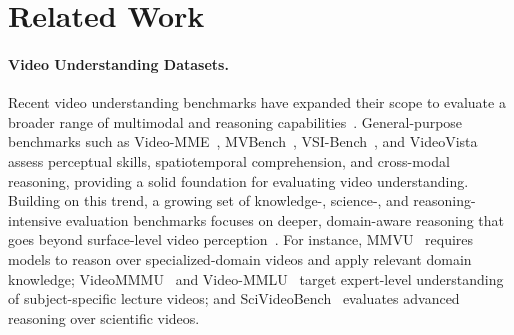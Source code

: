 \documentclass{llmxive}
\begin{document}
\section{Related Work}

\paragraph{Video Understanding Datasets.}
Recent video understanding benchmarks have expanded their scope to evaluate a broader range of multimodal and reasoning capabilities~\cite{Wu2024STARAB, Zhou2024MLVUBM, videmme, mmvu, scivideobench, li2024videovistaversatilebenchmarkvideo, liu2026videoreasonbenchmllmsperformvisioncentric, xu2025expvidbenchmarkexperimentvideo}.
General-purpose benchmarks such as Video-MME~\cite{videmme}, MVBench~\cite{mvbench}, VSI-Bench~\cite{vsibench}, and VideoVista~\cite{li2024videovistaversatilebenchmarkvideo} assess perceptual skills, spatiotemporal comprehension, and cross-modal reasoning, providing a solid foundation for evaluating video understanding.
Building on this trend, a growing set of knowledge-, science-, and reasoning-intensive evaluation benchmarks focuses on deeper, domain-aware reasoning that goes beyond surface-level video perception~\cite{xu2025expvidbenchmarkexperimentvideo, liu2026videoreasonbenchmllmsperformvisioncentric}.
For instance, MMVU~\cite{mmvu} requires models to reason over specialized-domain videos and apply relevant domain knowledge; VideoMMMU~\cite{videommmu} and Video-MMLU~\cite{song2025video} target expert-level understanding of subject-specific lecture videos; and SciVideoBench~\cite{scivideobench} evaluates advanced reasoning over scientific videos.
\end{document}
